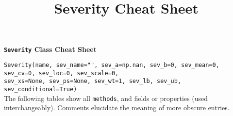 %
%


\title{Severity Cheat Sheet}




{\huge{\textbf{\texttt{Severity} Class Cheat Sheet}}}

\raggedright %
\texttt{\m Severity(name, sev\_name="", sev\_a=np.nan, sev\_b=0, sev\_mean=0, sev\_cv=0, sev\_loc=0, sev\_scale=0,} \\
\texttt{\phantom{\m Severity(}sev\_xs=None, sev\_ps=None, sev\_wt=1, sev\_lb, sev\_ub, sev\_conditional=True) }\\

The following tables show all \texttt{\m methods}, and fields or properties (used interchangeably). Comments elucidate the meaning of more obscure entries.


